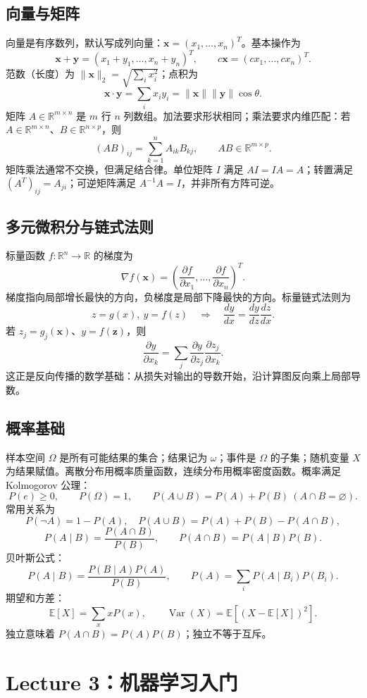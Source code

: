 \documentclass[UTF8,11pt,a4paper]{ctexart}
\newcommand{\R}{\mathbb{R}}\newcommand{\E}{\mathbb{E}}\newcommand{\argmin}{\mathop{\mathrm{argmin}}}\newcommand{\argmax}{\mathop{\mathrm{argmax}}}
\begin{document}
\subsection{向量与矩阵}
向量是有序数列，默认写成列向量：$\bm{x}=(x_1,\ldots,x_n)^T$。基本操作为
\[
\bm{x}+\bm{y}=(x_1+y_1,\ldots,x_n+y_n)^T,\qquad c\bm{x}=(cx_1,\ldots,cx_n)^T.
\]
范数（长度）为 $\|\bm{x}\|_2=\sqrt{\sum_i x_i^2}$；点积为
\[
\bm{x}\cdot\bm{y}=\sum_i x_i y_i=\|\bm{x}\|\|\bm{y}\|\cos\theta.
\]
矩阵 $A\in\R^{m\times n}$ 是 $m$ 行 $n$ 列数组。加法要求形状相同；乘法要求内维匹配：若 $A\in\R^{m\times n}$、$B\in\R^{n\times p}$，则
\[
(AB)_{ij}=\sum_{k=1}^{n}A_{ik}B_{kj},\qquad AB\in\R^{m\times p}.
\]
矩阵乘法通常不交换，但满足结合律。单位矩阵 $I$ 满足 $AI=IA=A$；转置满足 $(A^T)_{ij}=A_{ji}$；可逆矩阵满足 $A^{-1}A=I$，并非所有方阵可逆。

\subsection{多元微积分与链式法则}
标量函数 $f:\R^n\to\R$ 的梯度为
\[
\nabla f(\bm{x})=\left(\frac{\partial f}{\partial x_1},\ldots,\frac{\partial f}{\partial x_n}\right)^T.
\]
梯度指向局部增长最快的方向，负梯度是局部下降最快的方向。标量链式法则为
\[
z=g(x),\ y=f(z)\quad\Longrightarrow\quad\frac{dy}{dx}=\frac{dy}{dz}\frac{dz}{dx}.
\]
若 $z_j=g_j(\bm{x})$、$y=f(\bm{z})$，则
\[
\frac{\partial y}{\partial x_k}=\sum_j\frac{\partial y}{\partial z_j}\frac{\partial z_j}{\partial x_k}.
\]
这正是反向传播的数学基础：从损失对输出的导数开始，沿计算图反向乘上局部导数。

\subsection{概率基础}
样本空间 $\Omega$ 是所有可能结果的集合；结果记为 $\omega$；事件是 $\Omega$ 的子集；随机变量 $X$ 为结果赋值。离散分布用概率质量函数，连续分布用概率密度函数。概率满足 Kolmogorov 公理：
\[
P(e)\ge0,\qquad P(\Omega)=1,\qquad P(A\cup B)=P(A)+P(B)\ (A\cap B=\varnothing).
\]
常用关系为
\[
P(\neg A)=1-P(A),\quad P(A\cup B)=P(A)+P(B)-P(A\cap B),
\]
\[
P(A\mid B)=\frac{P(A\cap B)}{P(B)},\qquad P(A\cap B)=P(A\mid B)P(B).
\]
贝叶斯公式：
\[
P(A\mid B)=\frac{P(B\mid A)P(A)}{P(B)},\qquad P(A)=\sum_iP(A\mid B_i)P(B_i).
\]
期望和方差：
\[
\E[X]=\sum_x xP(x),\qquad \operatorname{Var}(X)=\E[(X-\E[X])^2].
\]
独立意味着 $P(A\cap B)=P(A)P(B)$；独立不等于互斥。

\section{Lecture 3：机器学习入门}
\end{document}
